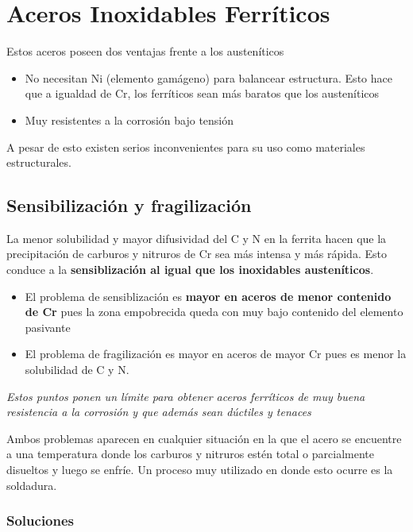 \section{Aceros Inoxidables Ferríticos}

Estos aceros poseen dos ventajas frente a los austeníticos
\begin{itemize}
	\item No necesitan Ni (elemento gamágeno) para balancear estructura. Esto hace que a igualdad de Cr, los ferríticos sean más baratos que los austeníticos
	\item Muy resistentes a la corrosión bajo tensión
\end{itemize}
A pesar de esto existen serios inconvenientes para su uso como materiales estructurales.

\subsection{Sensibilización y fragilización}
La menor solubilidad y mayor difusividad del C y N en la ferrita hacen que la precipitación de carburos y nitruros de Cr sea más intensa y más rápida. Esto conduce a la \textbf{sensiblización al igual que los inoxidables austeníticos}.

\begin{itemize}
	\item El problema de sensiblización es \textbf{mayor en aceros de menor contenido de Cr} pues la zona empobrecida queda con muy bajo contenido del elemento pasivante
	\item El problema de fragilización es mayor en aceros de mayor Cr pues es menor la solubilidad de C y N.
\end{itemize}

\emph{Estos puntos ponen un límite para obtener aceros ferríticos de muy buena resistencia a la corrosión y que además sean dúctiles y tenaces}

Ambos problemas aparecen en cualquier situación en la que el acero se encuentre a una temperatura donde los carburos y nitruros estén total o parcialmente disueltos y luego se enfríe. Un proceso muy utilizado en donde esto ocurre es la soldadura.

\subsubsection{Soluciones}

